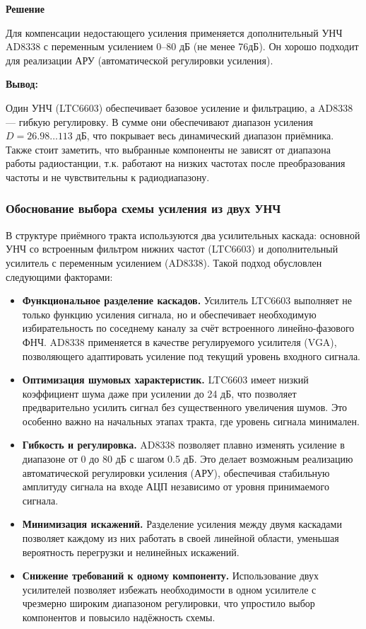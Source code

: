 \documentclass[a4paper,12pt]{article}
\begin{document}
\textbf{Решение }

Для компенсации недостающего усиления применяется дополнительный УНЧ AD8338 с переменным усилением 0–80 дБ (не менее 76дБ). Он хорошо подходит для реализации АРУ (автоматической регулировки усиления).



\textbf{Вывод:} 

Один УНЧ (LTC6603) обеспечивает базовое усиление и фильтрацию, а AD8338 — гибкую регулировку. В сумме они обеспечивают диапазон усиления $D = 26.98 \ldots 113$ дБ, что покрывает весь динамический диапазон приёмника.
Также стоит заметить, что выбранные компоненты не зависят от диапазона работы радиостанции, т.к. работают на низких частотах после преобразования частоты и не чувствительны к радиодиапазону.



\subsubsection{Обоснование выбора схемы усиления из двух УНЧ}

В структуре приёмного тракта используются два усилительных каскада: основной УНЧ со встроенным фильтром нижних частот (LTC6603) и дополнительный усилитель с переменным усилением (AD8338). Такой подход обусловлен следующими факторами:

\begin{itemize}
\item \textbf{Функциональное разделение каскадов.} Усилитель LTC6603 выполняет не только функцию усиления сигнала, но и обеспечивает необходимую избирательность по соседнему каналу за счёт встроенного линейно-фазового ФНЧ. AD8338 применяется в качестве регулируемого усилителя (VGA), позволяющего адаптировать усиление под текущий уровень входного сигнала.

\item \textbf{Оптимизация шумовых характеристик.} LTC6603 имеет низкий коэффициент шума даже при усилении до 24 дБ, что позволяет предварительно усилить сигнал без существенного увеличения шумов. Это особенно важно на начальных этапах тракта, где уровень сигнала минимален.

\item \textbf{Гибкость и регулировка.} AD8338 позволяет плавно изменять усиление в диапазоне от 0 до 80 дБ с шагом 0.5 дБ. Это делает возможным реализацию автоматической регулировки усиления (АРУ), обеспечивая стабильную амплитуду сигнала на входе АЦП независимо от уровня принимаемого сигнала.

\item \textbf{Минимизация искажений.} Разделение усиления между двумя каскадами позволяет каждому из них работать в своей линейной области, уменьшая вероятность перегрузки и нелинейных искажений.

\item \textbf{Снижение требований к одному компоненту.} Использование двух усилителей позволяет избежать необходимости в одном усилителе с чрезмерно широким диапазоном регулировки, что упростило выбор компонентов и повысило надёжность схемы.

\end{itemize}
\end{document}
